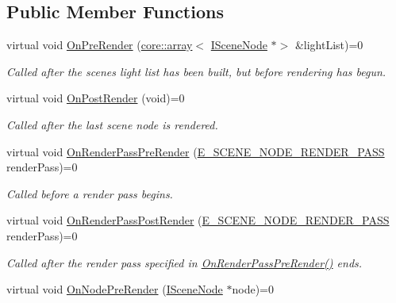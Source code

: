 \subsection*{Public Member Functions}
\begin{DoxyCompactItemize}
\item 
virtual void \hyperlink{classirr_1_1scene_1_1ILightManager_a07d93dbbdba50c7a26d1c293949e3781}{On\+Pre\+Render} (\hyperlink{classirr_1_1core_1_1array}{core\+::array}$<$ \hyperlink{classirr_1_1scene_1_1ISceneNode}{I\+Scene\+Node} $\ast$$>$ \&light\+List)=0
\begin{DoxyCompactList}\small\item\em Called after the scene\textquotesingle{}s light list has been built, but before rendering has begun. \end{DoxyCompactList}\item 
virtual void \hyperlink{classirr_1_1scene_1_1ILightManager_ac8f92f0fbd43ba9cb01b47647125a1a3}{On\+Post\+Render} (void)=0
\begin{DoxyCompactList}\small\item\em Called after the last scene node is rendered. \end{DoxyCompactList}\item 
virtual void \hyperlink{classirr_1_1scene_1_1ILightManager_a56eaec6a697659f40b4f29b681fbdfad}{On\+Render\+Pass\+Pre\+Render} (\hyperlink{namespaceirr_1_1scene_a7862269bd1abc123929d4dbb8200d67f}{E\+\_\+\+S\+C\+E\+N\+E\+\_\+\+N\+O\+D\+E\+\_\+\+R\+E\+N\+D\+E\+R\+\_\+\+P\+A\+SS} render\+Pass)=0
\begin{DoxyCompactList}\small\item\em Called before a render pass begins. \end{DoxyCompactList}\item 
virtual void \hyperlink{classirr_1_1scene_1_1ILightManager_a189edbf3a16ebb3c82e5d9f93dd2b41b}{On\+Render\+Pass\+Post\+Render} (\hyperlink{namespaceirr_1_1scene_a7862269bd1abc123929d4dbb8200d67f}{E\+\_\+\+S\+C\+E\+N\+E\+\_\+\+N\+O\+D\+E\+\_\+\+R\+E\+N\+D\+E\+R\+\_\+\+P\+A\+SS} render\+Pass)=0
\begin{DoxyCompactList}\small\item\em Called after the render pass specified in \hyperlink{classirr_1_1scene_1_1ILightManager_a56eaec6a697659f40b4f29b681fbdfad}{On\+Render\+Pass\+Pre\+Render()} ends. \end{DoxyCompactList}\item 
virtual void \hyperlink{classirr_1_1scene_1_1ILightManager_a23ae7bdf54613e6dd41d4138cb6f5edc}{On\+Node\+Pre\+Render} (\hyperlink{classirr_1_1scene_1_1ISceneNode}{I\+Scene\+Node} $\ast$node)=0
$$
\end{DoxyCompactItemize}
